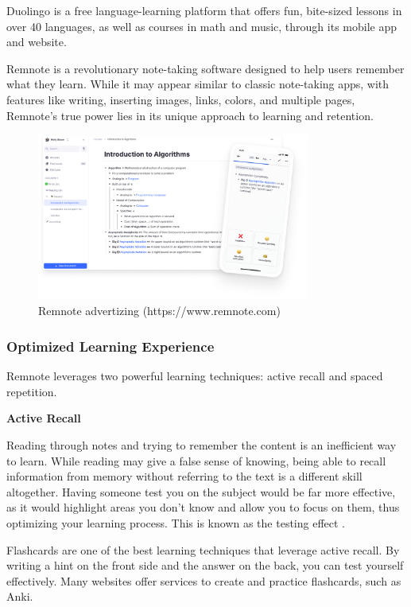 \documentclass{article}
\begin{document}
Duolingo is a free language-learning platform that offers fun, bite-sized lessons in over 40 languages, as well as courses in math and music, through its mobile app and website.

Remnote is a revolutionary note-taking software designed to help users remember what they learn. While it may appear similar to classic note-taking apps, with features like writing, inserting images, links, colors, and multiple pages, Remnote's true power lies in its unique approach to learning and retention.

\begin{figure}[h]
    \centering
    \includegraphics[width=0.8\textwidth]{./images/remnote_ad.png}
    \caption{Remnote advertizing (https://www.remnote.com)}
\end{figure}

\subsubsection{Optimized Learning Experience}

Remnote leverages two powerful learning techniques: active recall and spaced repetition.

\textbf{Active Recall}

Reading through notes and trying to remember the content is an inefficient way to learn. While reading may give a false sense of knowing, being able to recall information from memory without referring to the text is a different skill altogether. Having someone test you on the subject would be far more effective, as it would highlight areas you don't know and allow you to focus on them, thus optimizing your learning process. This is known as the testing effect \cite{https://en.wikipedia.org/wiki/Testing_effect}.

Flashcards are one of the best learning techniques that leverage active recall. By writing a hint on the front side and the answer on the back, you can test yourself effectively. Many websites offer services to create and practice flashcards, such as Anki.
\end{document}
